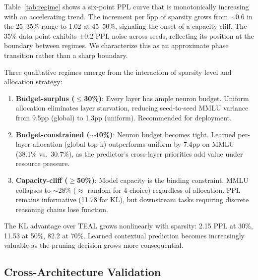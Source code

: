 \documentclass[11pt,a4paper]{article}
\begin{document}
Table~\ref{tab:regime} shows a six-point PPL curve that is monotonically increasing with an accelerating trend. The increment per 5pp of sparsity grows from ${\sim}$0.6 in the 25--35\% range to 1.02 at 45--50\%, signaling the onset of a capacity cliff. The 35\% data point exhibits $\pm$0.2 PPL noise across seeds, reflecting its position at the boundary between regimes. We characterize this as an approximate phase transition rather than a sharp boundary.

Three qualitative regimes emerge from the interaction of sparsity level and allocation strategy:

\begin{enumerate}
\item \textbf{Budget-surplus ($\leq$30\%)}: Every layer has ample neuron budget. Uniform allocation eliminates layer starvation, reducing seed-to-seed MMLU variance from 9.5pp (global) to 1.3pp (uniform). Recommended for deployment.

\item \textbf{Budget-constrained (${\sim}$40\%)}: Neuron budget becomes tight. Learned per-layer allocation (global top-k) outperforms uniform by 7.4pp on MMLU (38.1\% vs.\ 30.7\%), as the predictor's cross-layer priorities add value under resource pressure.

\item \textbf{Capacity-cliff ($\geq$50\%)}: Model capacity is the binding constraint. MMLU collapses to ${\sim}$28\% ($\approx$ random for 4-choice) regardless of allocation. PPL remains informative (11.78 for KL), but downstream tasks requiring discrete reasoning chains lose function.
\end{enumerate}

The KL advantage over TEAL grows nonlinearly with sparsity: 2.15 PPL at 30\%, 11.53 at 50\%, 82.2 at 70\%. Learned contextual prediction becomes increasingly valuable as the pruning decision grows more consequential.

\subsection{Cross-Architecture Validation}
\end{document}
